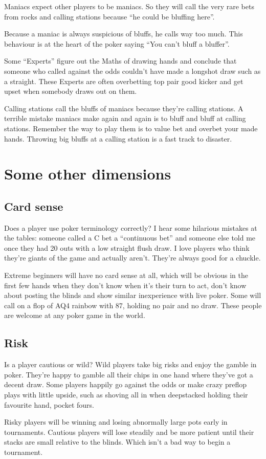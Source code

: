 Maniacs expect other players to be maniacs. So they will call the
very rare bets from rocks and calling stations because ``he could
be bluffing here''.

Because a maniac is always suspicious of bluffs, he calls way too much.
This behaviour is at the heart of the poker saying ``You can't bluff
a bluffer''.

Some ``Experts'' figure out the Maths of drawing hands and conclude
that someone who called against the odds couldn't have made a longshot
draw such as a straight. These Experts are often overbetting top pair
good kicker and get upset when somebody draws out on them.

Calling stations call the bluffs of maniacs because they're calling
stations. A terrible mistake maniacs 
make again and again is to bluff and bluff at calling
stations. Remember the way to play them is to value bet and overbet
your made hands. Throwing big bluffs at a calling station is a 
fast track to disaster.

\section{Some other dimensions}

\subsection{Card sense}

Does a player use poker terminology correctly? I hear some hilarious
mistakes at the tables: someone called a C bet a ``continuous bet''
and someone else told me once they had 20 outs with a low straight
flush draw. I love players who think they're giants of the game
and actually aren't. They're always good for a chuckle.

Extreme beginners will have no card sense at all, which will be
obvious in the first few hands when they don't know when it's
their turn to act, don't know about posting the blinds and show
similar inexperience with live poker. Some will call on a flop
of AQ4 rainbow with 87, holding no pair and no draw. These people
are welcome at any poker game in the world.

\subsection{Risk}

Is a player cautious or wild? Wild players take big risks and
enjoy the gamble in poker. They're happy to gamble all their chips
in one hand where they've got a decent draw. Some players happily
go against the odds or make crazy preflop plays with little upside,
such as shoving all in when deepstacked holding their favourite
hand, pocket fours. 

Risky players will be winning and losing abnormally large pots
early in tournaments. Cautious players will lose steadily and be
more patient until their stacks are small relative to the blinds.
Which isn't a bad way to begin a tournament.
